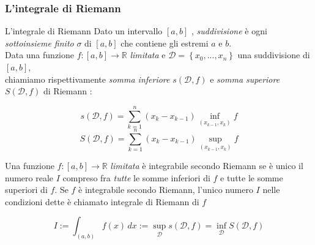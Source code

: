 \begin{frame}[label=L'integrale di Riemann]
  \frametitle{L'integrale di Riemann}
  \begin{block}{L'integrale di Riemann}    
    Dato un intervallo $[a,b]$ , \textit{suddivisione} è ogni \textit{sottoinsieme finito} $\sigma$ di $[a,b]$ che contiene gli estremi $a$ e $b$. \\

    Data una funzione $f : [a,b] \rightarrow \mathbb{R}$ \textit{limitata} e $ \mathcal{D} = \left\{x_0,...,x_n\right\} $ una suddivisione di $[a,b]$,\\
    chiamiamo rispettivamente \textit{somma inferiore} $s(\mathcal{D},f)$ e \textit{somma superiore} $S(\mathcal{D},f)$ di Riemann :
    \begin{center}
      \[s(\mathcal{D},f) = \sum_{k = 1}^n (x_k-x_{k-1})\inf_{(x_{k-1},x_k)} f\]
      \[S(\mathcal{D},f) = \sum_{k = 1}^n (x_k-x_{k-1})\sup_{(x_{k-1},x_k)} f\]
    \end{center}

    Una funzione $f : [a,b] \rightarrow \mathbb{R}$ \textit{limitata} è integrabile secondo Riemann se è unico il numero reale $I$ compreso 
    fra \textit{tutte} le somme inferiori di $f$ e tutte le somme superiori di $f$. Se $f$ è integrabile secondo Riemann, l'unico numero $I$ 
    nelle condizioni dette è chiamato integrale di Riemann di $f$

    \begin{center}
      \[ I := \int_{(a,b)} f(x) \,dx := \sup_\mathcal{D} s(\mathcal{D},f)  =  \inf_\mathcal{D} S(\mathcal{D},f) \]
    \end{center}


    \end{block}    




\end{frame}
